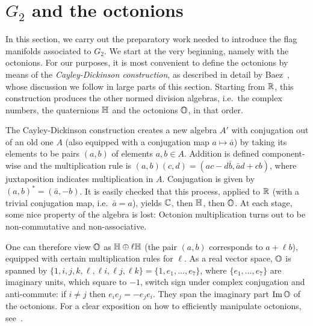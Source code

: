 \section{\texorpdfstring{$G_2$}{G2} and the octonions}

In this section, we carry out the preparatory work needed to introduce the flag manifolds associated to $G_2$. We start at the very beginning, namely with the octonions. For our purposes, it is most convenient to define the octonions by means of the \emph{Cayley-Dickinson construction}, as described in detail by Baez~\cite{Bae2002}, whose discussion we follow in large parts of this section. Starting from $\mathbb{R}$, this construction produces the other normed division algebras, i.e.~the complex numbers, the quaternions $\mathbb{H}$ and the octonions $\mathbb{O}$, in that order. 

The Cayley-Dickinson construction creates a new algebra $A'$ with conjugation out of an old one  $A$ (also equipped with a conjugation map $a\mapsto \bar a$) by taking its elements to be pairs $(a,b)$ of elements $a,b\in A$. Addition is defined component-wise and the multiplication rule is $(a,b)(c,d)=(ac-d\bar b,\bar ad+cb)$, where juxtaposition indicates multiplication in $A$. Conjugation is given by $(a,b)^*=(\bar a,-b)$. It is easily checked that this process, applied to $\mathbb{R}$ (with a trivial conjugation map, i.e.~$\bar a=a$), yields $\mathbb{C}$, then $\mathbb{H}$, then $\mathbb{O}$. At each stage, some nice property of the algebra is lost: Octonion multiplication turns out to be non-commutative and non-associative. 

One can therefore view $\mathbb{O}$ as $\mathbb{H}\oplus \ell\mathbb{H}$ (the pair $(a,b)$ corresponds to $a+\ell b$), equipped with certain multiplication rules for $\ell$. As a real vector space, $\mathbb{O}$ is spanned by $\{1,i,j,k,\ell,\ell i,\ell j,\ell k\} = \{1,e_1,\dots,e_7\}$, where $\{e_1,\dots, e_7\}$ are imaginary units, which square to $-1$, switch sign under complex conjugation and anti-commute: if $i\neq j$ then $e_ie_j=-e_je_i$. They span the imaginary part $\operatorname{Im} \mathbb{O}$ of the octonions. For a clear exposition on how to efficiently manipulate octonions, see~\cite[Sec.~1]{Bry1982}.

